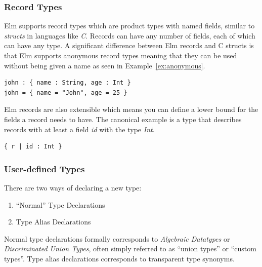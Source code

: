 \documentclass[../thesis.tex]{subfiles}
\begin{document}
\subsubsection{Record Types}
Elm supports record types which are product types with named fields, similar to \textit{structs} in languages like \textit{C}.
Records can have any number of fields, each of which can have any type.
A significant difference between Elm records and C structs is that Elm supports anonymous record types
meaning that they can be used without being given a name as seen in Example~\ref{ex:anonymous}.
\begin{example}\label{ex:anonymous}
\begin{verbatim}
john : { name : String, age : Int }
john = { name = "John", age = 25 }
\end{verbatim}
\end{example}
Elm records are also extensible which means you can define a lower bound
for the fields a record needs to have.
The canonical example is a type that describes records with at least a field \textit{id} with the type \textit{Int}.
\begin{example}
\begin{verbatim}
{ r | id : Int }
\end{verbatim}
\end{example}




\subsubsection{User-defined Types}
There are two ways of declaring a new type:
\begin{enumerate}
    \item{``Normal'' Type Declarations} 
    \item{Type Alias Declarations} 
\end{enumerate}
Normal type declarations formally corresponds to \textit{Algebraic Datatypes} or \textit{Discriminated Union Types},
often simply referred to as ``union types'' or ``custom types''.
Type alias declarations corresponds to transparent type synonyms.
\end{document}

